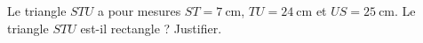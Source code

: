 
\begin{exercice}\label{exosmath-0954}

    Le triangle \( STU\) a pour mesures \( ST=\SI{7}{\centi\meter}\), \( TU=\SI{24}{\centi\meter}\) et \( US=\SI{25}{\centi\meter}\). Le triangle \( STU\) est-il rectangle ? Justifier.

\end{exercice}
